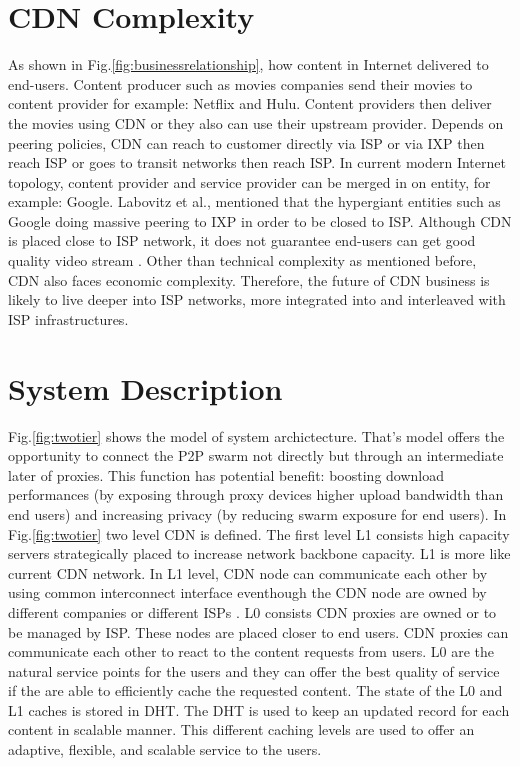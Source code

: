 \documentclass[paper]{ieice}
\begin{document}
\section{CDN Complexity}
As shown in Fig.\ref{fig:businessrelationship}, how content in Internet delivered to end-users.  
Content producer such as movies companies send their movies to content provider for example: Netflix and Hulu.
Content providers then deliver the movies using CDN or they also can use their upstream provider.
Depends on peering policies, CDN can reach to customer directly via ISP or via IXP then reach ISP or goes to transit networks then reach ISP.   
In current modern Internet topology, content provider and service provider can be merged in on entity, for example: Google.
Labovitz et al.,\cite{Labovitz:2010:IIT:2043164.1851194} mentioned that the hypergiant entities such as Google doing massive peering to IXP in order to be closed to ISP. 
Although CDN is placed close to ISP network, it does not guarantee end-users can get good quality video stream \cite{Krishnan:2009:MBE:1644893.1644917}.
Other than technical complexity as mentioned before, CDN also faces economic complexity.
Therefore, the future of CDN business is likely to live deeper into ISP networks, more integrated into and interleaved with ISP infrastructures.




\section{System Description}\label{description}

Fig.\ref{fig:twotier} shows the model of system archictecture.
That's model offers the opportunity to connect the P2P swarm not directly but through an intermediate later of proxies.
This function has potential benefit: boosting download performances (by exposing through proxy devices higher upload bandwidth than end users) and increasing privacy (by reducing swarm exposure for end users).
In Fig.\ref{fig:twotier} two level CDN is defined.
The first level L1 consists high capacity servers strategically placed to increase network backbone capacity.
L1 is more like current CDN network.
In L1 level, CDN node can communicate each other by using common interconnect interface eventhough the CDN node are owned by different companies or different ISPs \cite{cdni}.
L0 consists CDN proxies are owned or to be managed by ISP.
These nodes are placed closer to end users. 
CDN proxies can communicate each other to react to the content requests from users.
L0 are the natural service points for the users and they can offer the best quality of service if the are able to efficiently cache the requested content.
The state of the L0 and L1 caches is stored in DHT. 
The DHT is used to keep an updated record for each content in scalable manner. 
This different caching levels are used to offer an adaptive, flexible, and scalable service to the users.
\end{document}
